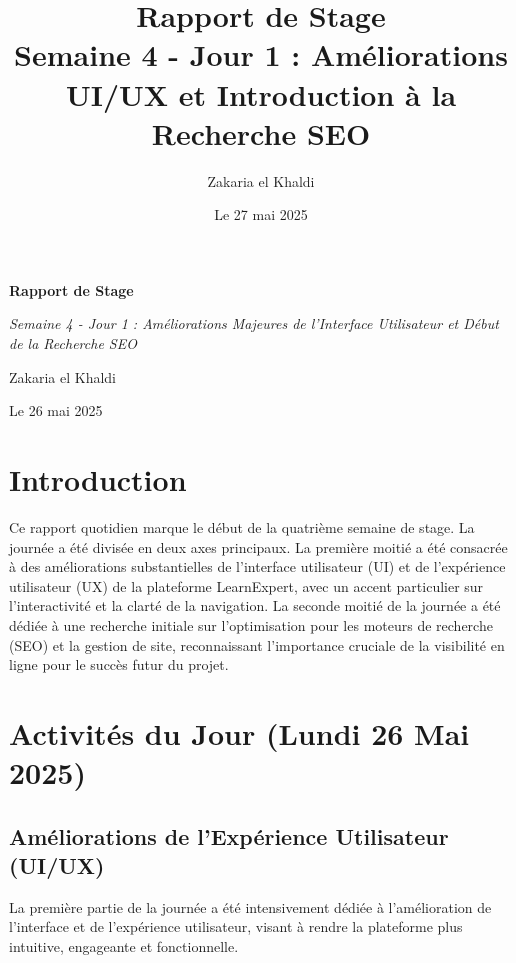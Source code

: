 \documentclass[12pt, a4paper]{article}
\title{\Huge\bfseries\color{primary} Rapport de Stage \\ 
      \Large Semaine 4 - Jour 1 : Améliorations UI/UX et Introduction à la Recherche SEO} %
\author{\Large Zakaria el Khaldi}
\date{\large Le 27 mai 2025} %
\begin{document}
\begin{titlepage}
  \centering
  {\Huge\bfseries\color{primary} Rapport de Stage \par}
  \vspace{1cm}
  {\Large\itshape Semaine 4 - Jour 1 : Améliorations Majeures de l'Interface Utilisateur et Début de la Recherche SEO\par} %
  \vspace{2cm}
  
  \vspace{2cm}
  {\Large Zakaria el Khaldi\par}
  \vfill
  {\large Le 26 mai 2025\par} %
\end{titlepage}

\tableofcontents
\thispagestyle{empty}
\newpage

\section{Introduction}
\thispagestyle{fancy}
Ce rapport quotidien marque le début de la quatrième semaine de stage. La journée a été divisée en deux axes principaux. La première moitié a été consacrée à des améliorations substantielles de l'interface utilisateur (UI) et de l'expérience utilisateur (UX) de la plateforme LearnExpert, avec un accent particulier sur l'interactivité et la clarté de la navigation. La seconde moitié de la journée a été dédiée à une recherche initiale sur l'optimisation pour les moteurs de recherche (SEO) et la gestion de site, reconnaissant l'importance cruciale de la visibilité en ligne pour le succès futur du projet.

\section{Activités du Jour (Lundi 26 Mai 2025)} %

\subsection{Améliorations de l'Expérience Utilisateur (UI/UX)}
La première partie de la journée a été intensivement dédiée à l'amélioration de l'interface et de l'expérience utilisateur, visant à rendre la plateforme plus intuitive, engageante et fonctionnelle.
\end{document}
